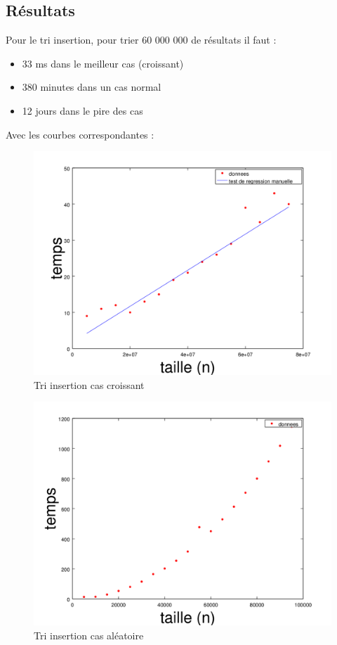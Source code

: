 \documentclass{article}
\begin{document}
\subsection{Résultats}
Pour le tri insertion, pour trier 60 000 000 de résultats il faut :
\begin{itemize}
  \item 33 ms dans le meilleur cas (croissant)
  \item 380 minutes dans un cas normal
  \item 12 jours dans le pire des cas
\end{itemize}
Avec les courbes correspondantes :
\begin{figure}
	\begin{center}
		\includegraphics[scale=0.7]{croissant}\\
		Tri insertion cas croissant
	\end{center}
\end{figure}
\begin{figure}
	\begin{center}
		\includegraphics[scale=0.7]{random}\\
		Tri insertion cas aléatoire
	\end{center}
\end{figure}
\end{document}

